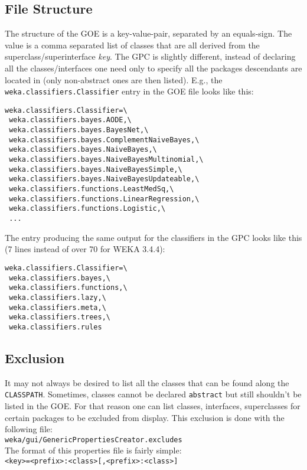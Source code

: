 \subsection{File Structure}
The structure of the GOE is a key-value-pair, separated by an
equals-sign. The value is a comma separated list of classes that are
all derived from the superclass/superinterface \textit{key}. The GPC is
slightly different, instead of declaring all the classes/interfaces
one need only to specify all the packages descendants are located in
(only non-abstract ones are then listed). E.g., the
\verb=weka.classifiers.Classifier= entry in the GOE file looks like this:
\begin{verbatim}
weka.classifiers.Classifier=\
 weka.classifiers.bayes.AODE,\
 weka.classifiers.bayes.BayesNet,\
 weka.classifiers.bayes.ComplementNaiveBayes,\
 weka.classifiers.bayes.NaiveBayes,\
 weka.classifiers.bayes.NaiveBayesMultinomial,\
 weka.classifiers.bayes.NaiveBayesSimple,\
 weka.classifiers.bayes.NaiveBayesUpdateable,\
 weka.classifiers.functions.LeastMedSq,\
 weka.classifiers.functions.LinearRegression,\
 weka.classifiers.functions.Logistic,\
 ...
\end{verbatim}
The entry producing the same output for the classifiers in the GPC
looks like this (7 lines instead of over 70 for WEKA 3.4.4):
\begin{verbatim}
weka.classifiers.Classifier=\
 weka.classifiers.bayes,\
 weka.classifiers.functions,\
 weka.classifiers.lazy,\
 weka.classifiers.meta,\
 weka.classifiers.trees,\
 weka.classifiers.rules
\end{verbatim}

\newpage
\subsection{Exclusion}
It may not always be desired to list all the classes that can be found
along the \verb=CLASSPATH=. Sometimes, classes cannot be declared \verb=abstract=
but still shouldn't be listed in the GOE. For that reason one can list
classes, interfaces, superclasses for certain packages to be excluded
from display. This exclusion is done with the following file:\\

\verb=weka/gui/GenericPropertiesCreator.excludes=\\

\noindent The format of this properties file is fairly simple:\\

\verb^<key>=<prefix>:<class>[,<prefix>:<class>]^\\

